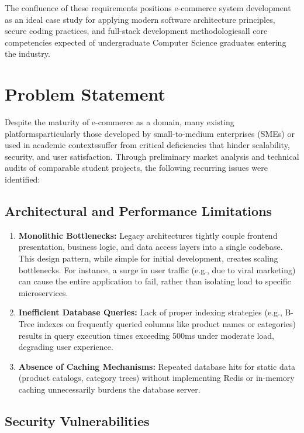 \documentclass[12pt, a4paper]{report}
\begin{document}
The confluence of these requirements positions e-commerce system development as an ideal case study for applying modern software architecture principles, secure coding practices, and full-stack development methodologiesall core competencies expected of undergraduate Computer Science graduates entering the industry.

\section{Problem Statement}

Despite the maturity of e-commerce as a domain, many existing platformsparticularly those developed by small-to-medium enterprises (SMEs) or used in academic contextssuffer from critical deficiencies that hinder scalability, security, and user satisfaction. Through preliminary market analysis and technical audits of comparable student projects, the following recurring issues were identified:

\subsection{Architectural and Performance Limitations}

\begin{enumerate}
    \item \textbf{Monolithic Bottlenecks:} Legacy architectures tightly couple frontend presentation, business logic, and data access layers into a single codebase. This design pattern, while simple for initial development, creates scaling bottlenecks. For instance, a surge in user traffic (e.g., due to viral marketing) can cause the entire application to fail, rather than isolating load to specific microservices.
    
    \item \textbf{Inefficient Database Queries:} Lack of proper indexing strategies (e.g., B-Tree indexes on frequently queried columns like product names or categories) results in query execution times exceeding 500ms under moderate load, degrading user experience. 
    
    \item \textbf{Absence of Caching Mechanisms:} Repeated database hits for static data (product catalogs, category trees) without implementing Redis or in-memory caching unnecessarily burdens the database server.
\end{enumerate}

\subsection{Security Vulnerabilities}
\end{document}
